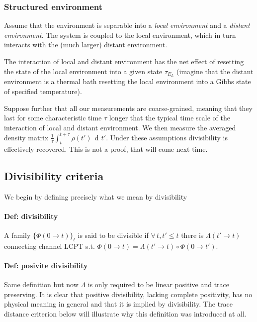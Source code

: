 \documentclass[a4paper, 11pt]{article}
\newcommand{\dd}{\mathop{\mathrm{d}\!}{}}
\begin{document}
	\subsubsection{Structured environment}
	Assume that the environment is separable into a \emph{local environment} and a \emph{distant environment}. The system is coupled to the local environment, which in turn interacts with the (much larger) distant environment.
	
	The interaction of local and distant environment has the net effect of resetting the state of the local environment into a given state $\tau_{E_L}$ (imagine that the distant environment is a thermal bath resetting the local environment into a Gibbs state of specified temperature).
	
	Suppose further that all our measurements are coarse-grained, meaning that they last for some characteristic time $\tau$ longer that the typical time scale of the interaction of local and distant environment. We then measure the averaged density matrix $\frac{1}{\tau} \int_{t}^{t+\tau} \rho(t')\,\dd t'$. Under these assumptions divisibility is effectively recovered. This is not a proof, that will come next time.
	
	\subsection{Divisibility criteria}
	We begin by defining precisely what we mean by divisibility
	\paragraph{Def: divisibility} A family $\{\Phi(0\rightarrow t)\}_t$ is said to be divisible if $\forall\,t, t'\le t$ there is $\Lambda(t'\rightarrow t)$ connecting channel LCPT s.t. $\Phi(0\rightarrow t) = \Lambda(t'\rightarrow t) \circ \Phi(0\rightarrow t')$.
	
	\paragraph{Def: posivite divisibility} Same definition but now $\Lambda$ is only required to be linear positive and trace preserving. It is clear that positive divisibility, lacking complete positivity, has no physical meaning in general and that it is implied by divisibility. The trace distance criterion below will illustrate why this definition was introduced at all.
	\vspace{4mm}
	
\end{document}
